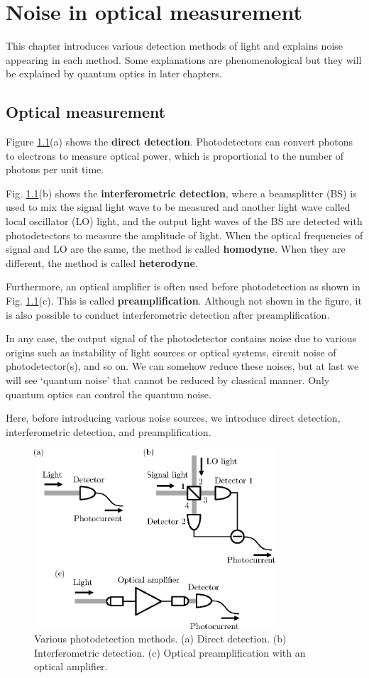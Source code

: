 \chapter{Noise in optical measurement}
This chapter introduces various detection methods of light and explains noise appearing in each method. Some explanations are phenomenological but they will be explained by quantum optics in later chapters.

\section{Optical measurement}
Figure \ref{fig:photodetection}(a) shows the \textbf{direct detection}. Photodetectors can convert photons to electrons to measure optical power, which is proportional to the number of photons per unit time. 

Fig. \ref{fig:photodetection}(b) shows the \textbf{interferometric detection}, where a beamsplitter (BS) is used to mix the signal light wave to be measured and another light wave called local oscillator (LO) light, and the output light waves of the BS are detected with photodetectors to measure the amplitude of light. When the optical frequencies of signal and LO are the same, the method is called \textbf{homodyne}. When they are different, the method is called \textbf{heterodyne}.

Furthermore, an optical amplifier is often used before photodetection as shown in Fig. \ref{fig:photodetection}(c). This is called \textbf{preamplification}. Although not shown in the figure, it is also possible to conduct interferometric detection after preamplification. 

In any case, the output signal of the photodetector contains noise due to various origins such as instability of light sources or optical systems, circuit noise of photodetector(s), and so on. We can somehow reduce these noises, but at last we will see `quantum noise' that cannot be reduced by classical manner. Only quantum optics can control the quantum noise.

Here, before introducing various noise sources, we introduce direct detection, interferometric detection, and preamplification.

\begin{figure}
  \centering
  \includegraphics[width=9cm]{fig/2-1_photodetection.eps}
  \caption{Various photodetection methods. (a) Direct detection. (b) Interferometric detection. (c) Optical preamplification with an optical amplifier.}
  \label{fig:photodetection}
\end{figure}


